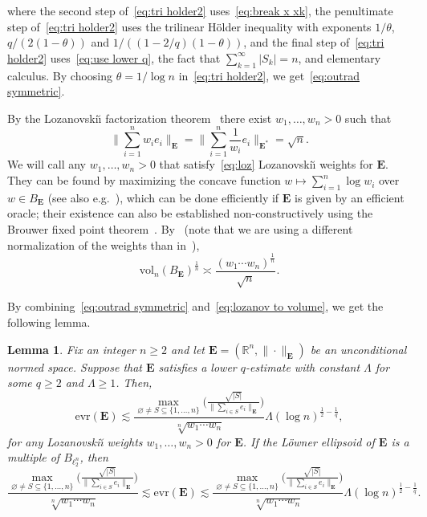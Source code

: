 \documentclass[11pt,reqno]{amsart}
\renewcommand{\ge}{\geqslant}
\newcommand{\evr}{\mathrm{evr}}
\newcommand{\n}{\{1,\ldots,n\}}
\newcommand{\R}{\mathbb R}
\newtheorem{lemma}[theorem]{Lemma}
\theoremstyle{remark}
\renewcommand{\subset}{\subseteq}
\renewcommand{\emptyset}{\varnothing}
\newcommand{\vol}{\mathrm{vol}}
\renewcommand{\1}{\mathbf 1}
\newcommand{\bfE}{\mathbf{E}}
\begin{document}
where the second step of~\eqref{eq:tri holder2} uses~\eqref{eq:break x xk}, the penultimate step of~\eqref{eq:tri holder2} uses the trilinear H\"older inequality with exponents $1/\theta$, $q/(2(1-\theta))$ and $1/((1-2/q)(1-\theta))$, and the final step of~\eqref{eq:tri holder2} uses~\eqref{eq:use lower q}, the fact that $\sum_{k=1}^\infty |S_k|=n$, and elementary calculus. By choosing $\theta=1/\log n$ in~\eqref{eq:tri holder2}, we get~\eqref{eq:outrad symmetric}.




By the Lozanovski\u{\i} factorization theorem~\cite{Loz69}  there exist $w_1,\ldots, w_n>0$ such that
\begin{equation}\label{eq:loz}
\Big\|\sum_{i=1}^n w_i e_i\Big\|_{\bfE}=\Big\|\sum_{i=1}^n \frac{1}{w_i}e_i\Big\|_{\bfE^{\textbf{*}}}=\sqrt{n}.
\end{equation}
We will call any $w_1,\ldots, w_n>0$  that satisfy~\eqref{eq:loz} Lozanovski\u{\i}  weights for $\bfE$. They can be found by maximizing the concave function $w\mapsto \sum_{i=1}^n \log w_i$ over $w\in B_{\bfE}$ (see also e.g.~\cite[Chapter~3]{Pis89}), which can be done efficiently if $\bfE$ is given by an efficient oracle; their existence can also be established non-constructively using the Brouwer fixed point theorem~\cite{JR76}. By~\cite[Lemma~1.2]{Sch82} (note that we are using a different  normalization of the weights than in~\cite{Sch82}),
\begin{equation}\label{eq:lozanov to volume}
\vol_n(B_\bfE)^{\frac{1}{n}}\asymp \frac{(w_1\cdots w_n)^{\frac{1}{n}}}{\sqrt{n}}.
\end{equation}

By combining~\eqref{eq:outrad symmetric}  and~\eqref{eq:lozanov to volume}, we get the following lemma.

\begin{lemma}\label{lem:unconditional volume ratio} Fix an integer $n\ge 2$ and let  $\bfE=(\R^n,\|\cdot\|_{\bfE})$ be an unconditional normed space. Suppose that $\bfE$ satisfies a lower $q$-estimate with constant $\Lambda$ for some $q\ge 2$ and $\Lambda\ge 1$. Then,
$$
\evr(\bfE)\lesssim  \frac{\max_{\emptyset\neq S\subset \n}\Big(\frac{\sqrt{|S|}}{\|\sum_{i\in S} e_i\|_\bfE}\Big)}{\sqrt[n]{w_1\cdots w_n}}\Lambda (\log n)^{\frac12-\frac{1}{q}},
$$
for any  Lozanovski\u{\i}  weights $w_1,\ldots,w_n>0$  for $\bfE$.
If the L\"owner ellipsoid of $\bfE$ is a multiple of $B_{\ell_2^n}$, then
$$
 \frac{\max_{\emptyset\neq S\subset \n}\Big(\frac{\sqrt{|S|}}{\|\sum_{i\in S} e_i\|_\bfE}\Big)}{\sqrt[n]{w_1\cdots w_n}}\lesssim \evr(\bfE)\lesssim  \frac{\max_{\emptyset\neq S\subset \n}\Big(\frac{\sqrt{|S|}}{\|\sum_{i\in S} e_i\|_\bfE}\Big)}{\sqrt[n]{w_1\cdots w_n}}\Lambda (\log n)^{\frac12-\frac{1}{q}}.
$$
\end{lemma}
\end{document}
